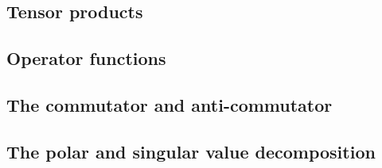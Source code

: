 \documentclass[
	11pt, %
	fleqn, %
	a4paper, %
]{LegrandOrangeBook}
\begin{document}
\subsection{Tensor products}


\subsection{Operator functions}


\subsection{The commutator and anti-commutator}


\subsection{The polar and singular value decomposition}


%     

% 

% 

% 
    
\end{document}
